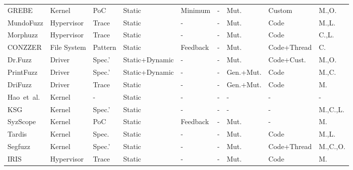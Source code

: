 \begin{footnotesize}
\begin{longtable}{m{1.8cm}m{1.3cm}m{0.6cm}m{1.6cm}m{1.0cm}m{0.8cm}m{0.9cm}m{1.3cm}m{0.5cm}}
        GREBE\cite{lin2022grebe} & Kernel & PoC & Static & Minimum & - & Mut. & Custom & M.,O. \\
        
        MundoFuzz\cite{myung2022mundofuzz} & Hypervisor & Trace & Static & - & - & Mut. & Code & M.,L. \\
        
        Morphuzz\cite{bulekov2022morphuzz} & Hypervisor & Trace & Static & - & - & Mut. & Code & C.,L. \\
        
        CONZZER\cite{CONZZER2022context} & File System & Pattern & Static & Feedback & - & Mut. & Code+Thread & C. \\
        
        
        Dr.Fuzz\cite{zhao2022semantic} & Driver & Spec.' & Static+Dynamic & - & - & Mut. & Code+Cust. & M.,O. \\
        
        PrintFuzz\cite{ma2022printfuzz} & Driver & Spec.' & Static+Dynamic & - & - & Gen.+Mut. & Code & M.,C.\\
        
        DriFuzz\cite{shen2022drifuzz} & Driver & Trace & Static & - & - & Gen.+Mut. & Code & M. \\
        
        Hao~et~al.\cite{Hao2022DemystifyingTD} & Kernel & - & Static & - & - & - & - & - \\
        
        KSG\cite{sun2022ksg} & Kernel & Spec.' & Static & - & - & - & - & M.,C.,L. \\
        
        SyzScope\cite{zou2022syzscope} & Kernel & PoC & Static & Feedback & - & Mut. & - & M. \\
        
        Tardis\cite{shen2022tardis} & Kernel & Spec. & Static & - & - & Mut. & Code & M.,L. \\
        
        Segfuzz\cite{jeong2023segfuzz} & Kernel & Spec.' & Static & - & - & Mut. & Code+Thread & M.,C.,O. \\
        
        IRIS\cite{cesarano2023iris} & Hypervisor & Trace & Static & - & - & Mut. & Code & M. \\
        

\end{longtable}
\end{footnotesize}
